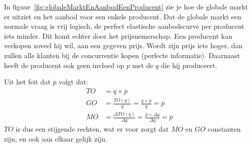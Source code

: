 In figuur~\ref{fig:globaleMarktEnAanbodEenProducent} zie je hoe de globale markt er uitziet en het aanbod voor een enkele producent. Dat de globale markt een normale vraag is vrij logisch, de perfect elastische aanbodscurve per producent iets minder. Dit komt echter door het prijsnemerschap. Een producent kan verkopen zoveel hij wil, aan een gegeven prijs. Wordt zijn prijs iets hoger, dan zullen alle klanten bij de concurrentie kopen (perfecte informatie). Daarnaast heeft de producent ook geen invloed op $p$ met de $q$ die hij produceert.

Uit het feit dat $\overline{p}$ volgt dat:
\begin{align}
   TO &= q \times \overline{p} \\
   GO &= \frac{TO(q)}{q} = \frac{q \times \overline{p}}{q} = \overline{p} \\
   MO &= \frac{\Delta TO(q)}{\Delta q} = \frac{\overline{p} \times \Delta q}{\Delta q} = \overline{p}
\end{align}
$TO$ is dus een stijgende rechten, wat er voor zorgt dat $MO$ en $GO$ constanten zijn, en ook aan elkaar gelijk zijn.
